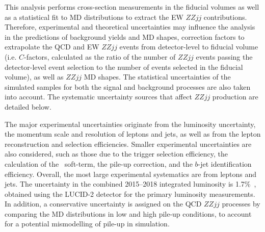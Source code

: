This analysis performs cross-section measurements in the fiducial volumes as well as a statistical fit to MD distributions to extract the EW $ZZjj$ contributions. Therefore, experimental and theoretical uncertainties may influence the analysis in the predictions of background yields and MD shapes,
correction factors to extrapolate the QCD and EW $ZZjj$ events from detector-level to fiducial volume
(i.e. $C$-factors, calculated as the ratio of the number of $ZZjj$ events passing the detector-level event selection to the number of events selected in the fiducial volume), as well as $ZZjj$ MD shapes.
The statistical uncertainties of the simulated samples for both the signal and background processes are also taken into account.
The systematic uncertainty sources that affect $ZZjj$ production are detailed below.

The major experimental uncertainties originate from the luminosity uncertainty, the momentum scale and resolution of leptons and jets,
as well as from the lepton reconstruction and selection efficiencies.
Smaller experimental uncertainties are also considered, such as those due to the trigger selection efficiency, the calculation of the \met~soft-term, the pile-up correction, and the $b$-jet identification efficiency. 
Overall, the most large experimental systematics are from leptons and jets.
The uncertainty in the combined 2015--2018 integrated luminosity is 1.7\%~\cite{ATLAS-CONF-2019-021}, obtained using the LUCID-2 detector \cite{LUCID2} for the primary luminosity measurements.
In addition, a conservative uncertainty is assigned on the QCD $ZZjj$ processes by comparing the MD distributions in low and high pile-up conditions, to account for a potential mismodelling of pile-up in simulation.

